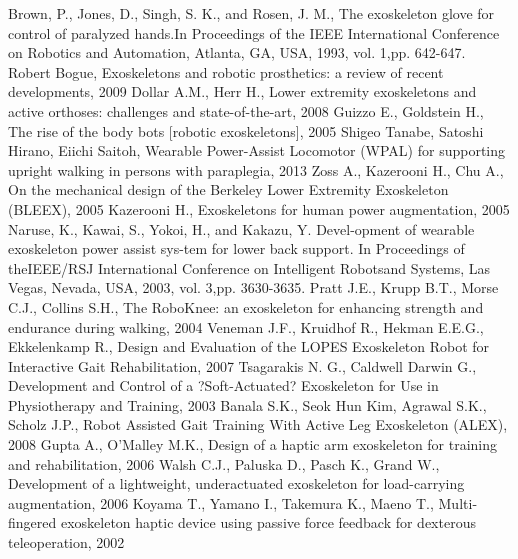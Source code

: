 \documentclass[letterpaper, 10 pt, conference]{ieeeconf}  %
\begin{document}


\begin{thebibliography}{99}

 Brown, P., Jones, D., Singh, S. K., and Rosen, J. M., The exoskeleton glove for control of paralyzed hands.In Proceedings of the IEEE 
International Conference on Robotics and Automation, Atlanta, GA, USA, 1993, vol. 1,pp. 642-647.
 Robert Bogue, Exoskeletons and robotic prosthetics: a review of recent developments, 2009
 Dollar A.M., Herr H., Lower extremity exoskeletons and active orthoses: challenges and state-of-the-art, 2008
 Guizzo E., Goldstein H., The rise of the body bots [robotic exoskeletons], 2005
 Shigeo Tanabe, Satoshi Hirano, Eiichi Saitoh, Wearable Power-Assist Locomotor (WPAL) for supporting upright walking in persons with paraplegia, 2013
 Zoss A., Kazerooni H., Chu A., On the mechanical design of the Berkeley Lower Extremity Exoskeleton (BLEEX), 2005 
 Kazerooni H., Exoskeletons for human power augmentation, 2005
 Naruse, K., Kawai, S., Yokoi, H., and Kakazu, Y. Devel-opment of wearable exoskeleton power assist sys-tem for lower back support. In Proceedings of theIEEE/RSJ International Conference on Intelligent Robotsand Systems, Las Vegas, Nevada, USA, 2003, vol. 3,pp. 3630-3635.
 Pratt J.E., Krupp B.T., Morse C.J., Collins S.H., The RoboKnee: an exoskeleton for enhancing strength and endurance during walking, 2004
 Veneman J.F., Kruidhof R., Hekman E.E.G., Ekkelenkamp R., Design and Evaluation of the LOPES Exoskeleton Robot for Interactive Gait Rehabilitation, 2007
 Tsagarakis N. G., Caldwell Darwin G., Development and Control of a ?Soft-Actuated? Exoskeleton for Use in Physiotherapy and Training, 2003
 Banala S.K., Seok Hun Kim, Agrawal S.K., Scholz J.P., Robot Assisted Gait Training With Active Leg Exoskeleton (ALEX), 2008
 Gupta A., O'Malley M.K., Design of a haptic arm exoskeleton for training and rehabilitation, 2006 
 Walsh C.J., Paluska D., Pasch K., Grand W., Development of a lightweight, underactuated exoskeleton for load-carrying augmentation, 2006
 Koyama T., Yamano I., Takemura K., Maeno T., Multi-fingered exoskeleton haptic device using passive force feedback for dexterous teleoperation, 2002

\end{thebibliography}
\end{document}
